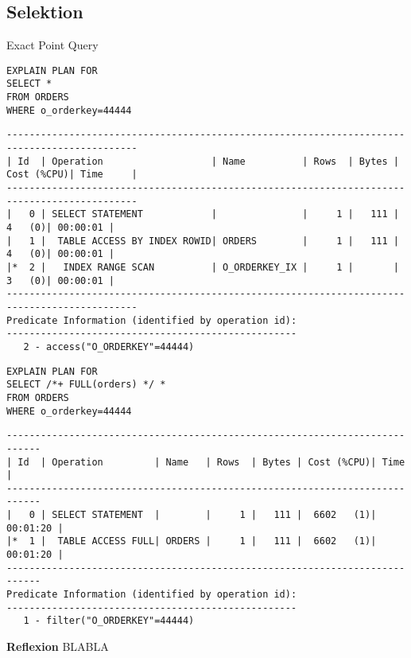 \documentclass[10pt]{article}
\begin{document}
\subsection{Selektion}
Exact Point Query
\begin{lstlisting}[style=sql]
EXPLAIN PLAN FOR
SELECT *
FROM ORDERS
WHERE o_orderkey=44444
\end{lstlisting}
\begin{lstlisting}[style=queryexecutionplan]
---------------------------------------------------------------------------------------------
| Id  | Operation                   | Name          | Rows  | Bytes | Cost (%CPU)| Time     |
---------------------------------------------------------------------------------------------
|   0 | SELECT STATEMENT            |               |     1 |   111 |     4   (0)| 00:00:01 |
|   1 |  TABLE ACCESS BY INDEX ROWID| ORDERS        |     1 |   111 |     4   (0)| 00:00:01 |
|*  2 |   INDEX RANGE SCAN          | O_ORDERKEY_IX |     1 |       |     3   (0)| 00:00:01 |
---------------------------------------------------------------------------------------------
Predicate Information (identified by operation id):
---------------------------------------------------
   2 - access("O_ORDERKEY"=44444)
\end{lstlisting}

\begin{lstlisting}[style=sql]
EXPLAIN PLAN FOR
SELECT /*+ FULL(orders) */ *
FROM ORDERS
WHERE o_orderkey=44444
\end{lstlisting}
\begin{lstlisting}[style=queryexecutionplan]
----------------------------------------------------------------------------
| Id  | Operation         | Name   | Rows  | Bytes | Cost (%CPU)| Time     |
----------------------------------------------------------------------------
|   0 | SELECT STATEMENT  |        |     1 |   111 |  6602   (1)| 00:01:20 |
|*  1 |  TABLE ACCESS FULL| ORDERS |     1 |   111 |  6602   (1)| 00:01:20 |
----------------------------------------------------------------------------
Predicate Information (identified by operation id):
---------------------------------------------------
   1 - filter("O_ORDERKEY"=44444)
\end{lstlisting}
\textbf{Reflexion} \newline
BLABLA
\end{document}
